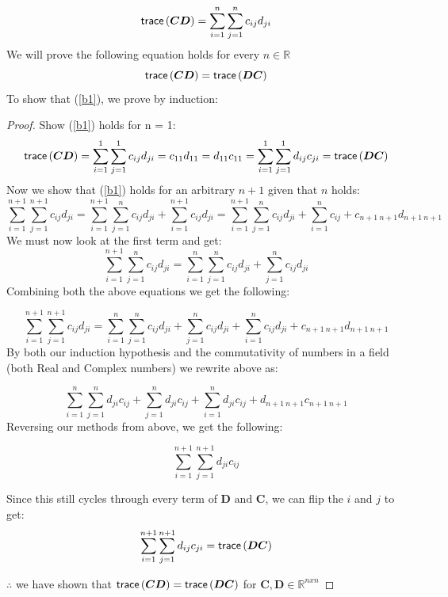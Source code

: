 \documentclass[answers,10pt]{exam}
\newcommand{\B}[1]{\boldsymbol{#1}}
\begin{document}
\begin{questions}
\begin{solution}
\begin{parts}
 $$
 \trace(\B{CD}) = \sum_{i = 1}^n\sum_{j = 1}^n c_{ij} d_{ji}
 $$
 We will prove the following equation holds for every $n \in \mathbb{R}$
 \begin{equation}\label{b1}
     \trace(\B{CD}) = \trace(\B{DC})
 \end{equation}
 To show that (\ref{b1}), we prove by induction:
 \begin{proof}
 Show (\ref{b1}) holds for n = 1: \\
 $$
 \trace(\B{CD}) = \sum_{i = 1}^1\sum_{j = 1}^1 c_{ij} d_{ji} = c_{11}d_{11} = d_{11}c_{11} = \sum_{i = 1}^1\sum_{j = 1}^1 d_{ij} c_{ji} = \trace(\B{DC})
 $$
 Now we show that (\ref{b1}) holds for an arbitrary $n + 1$ given that $n$ holds:
 $$
 \sum_{i = 1}^{n + 1}\sum_{j = 1}^{n + 1} c_{ij} d_{ji} = \sum_{i = 1}^{n + 1}\sum_{j = 1}^{n} c_{ij} d_{ji} + \sum_{i = 1}^{n + 1} c_{ij} d_{ji} = \sum_{i = 1}^{n + 1}\sum_{j = 1}^{n} c_{ij} d_{ji} + \sum_{i = 1}^{n} c_{ij} + c_{n + 1 \  n + 1}d_{n + 1 \  n + 1}
 $$
 We must now look at the first term and get: 
 $$
 \sum_{i = 1}^{n + 1}\sum_{j = 1}^{n} c_{ij} d_{ji} = \sum_{i = 1}^{n}\sum_{j = 1}^{n} c_{ij} d_{ji} + \sum_{j = 1}^{n}c_{ij} d_{ji}
 $$
 Combining both the above equations we get the following: 
 
 $$
 \sum_{i = 1}^{n + 1}\sum_{j = 1}^{n + 1} c_{ij} d_{ji} = \sum_{i = 1}^{n}\sum_{j = 1}^{n} c_{ij} d_{ji} + \sum_{j = 1}^{n}c_{ij} d_{ji} + \sum_{i = 1}^{n} c_{ij}d_{ji} + c_{n + 1 \  n + 1}d_{n + 1 \  n + 1}
 $$
 By both our induction hypothesis and the commutativity of numbers in a field (both Real and Complex numbers) we rewrite above as: 
 
 $$
 \sum_{i = 1}^{n}\sum_{j = 1}^{n} d_{ji} c_{ij} + \sum_{j = 1}^{n}d_{ji} c_{ij} + \sum_{i = 1}^{n} d_{ji}c_{ij} + d_{n + 1 \  n + 1}c_{n + 1 \  n + 1}
 $$
 Reversing our methods from above, we get the following: 
 
 $$
 \sum_{i = 1}^{n + 1}\sum_{j = 1}^{n + 1}  d_{ji} c_{ij}
 $$
 
 Since this still cycles through every term of $\B{D} \text{ and } \B{C}$, we can flip the $i$ and $j$ to get: 
 $$
 \sum_{i = 1}^{n + 1}\sum_{j = 1}^{n + 1}  d_{ij} c_{ji} = \trace(\B{DC})
 $$
 
 $\therefore $ we have shown that $\trace(\B{CD}) = \trace(\B{DC})$ for $\B{C},\B{D} \in \mathbb{R}^{nxn}$
 
 \end{proof}
 
 
 

\end{parts}
\end{solution}
\end{questions}
\end{document}
